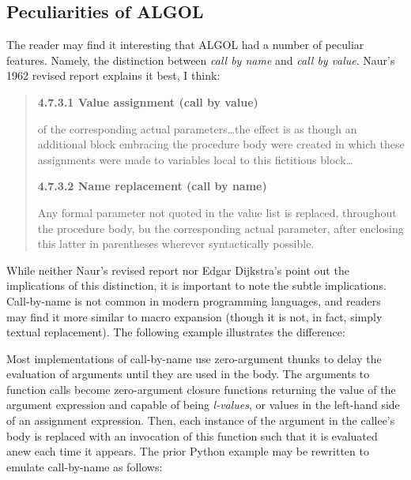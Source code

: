 \subsection{Peculiarities of ALGOL}

The reader may find it interesting that ALGOL had a number of peculiar features.
Namely, the distinction between \textit{call by name} and \textit{call by value}.
Naur's 1962 revised report explains it best, I think\cite[Section 4.7.3]{naur_revised_report_algol_1962}:

\begin{quotation}
	\noindent
	\textbf{4.7.3.1 Value assignment (call by value)}

	of the corresponding actual parameters\dots the effect is as though an
	additional block embracing the procedure body were created in which these
	assignments were made to variables local to this fictitious block\dots

	\noindent
	\textbf{4.7.3.2 Name replacement (call by name)}

	Any formal parameter not quoted in the value list is replaced, throughout the
	procedure body, bu the corresponding actual parameter, after enclosing this
	latter in parentheses wherever syntactically possible.
\end{quotation}

While neither Naur's revised report nor Edgar Dijkstra's
point out the implications of this distinction, it is important to note
the subtle implications.
Call-by-name is not common in modern programming languages, and readers
may find it more similar to macro expansion
(though it is not, in fact, simply textual replacement).
The following example illustrates the difference:



Most implementations of call-by-name use zero-argument thunks to delay
the evaluation of arguments until they are used in the body.
The arguments to function calls become zero-argument closure functions
returning the value of the argument expression and capable of being
\textit{l-values}, or values in the left-hand side of an assignment expression.
Then, each instance of the argument in the callee's body is replaced
with an invocation of this function such that it is evaluated anew
each time it appears.
The prior Python example may be rewritten to emulate call-by-name as follows:



